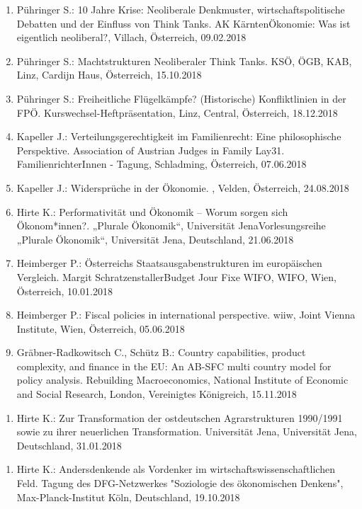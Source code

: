 \begin{enumerate}
	\item Pühringer S.: 10 Jahre Krise: Neoliberale Denkmuster, wirtschaftspolitische Debatten und der Einfluss von Think Tanks. AK KärntenÖkonomie: Was ist eigentlich neoliberal?, Villach, Österreich, 09.02.2018
	\item Pühringer S.: Machtstrukturen Neoliberaler Think Tanks. KSÖ, ÖGB, KAB, Linz, Cardijn Haus, Österreich, 15.10.2018
	\item Pühringer S.: Freiheitliche Flügelkämpfe? (Historische) Konfliktlinien in der FPÖ. Kurswechsel-Heftpräsentation, Linz, Central, Österreich, 18.12.2018
	\item Kapeller J.: Verteilungsgerechtigkeit im Familienrecht: Eine philosophische Perspektive. Association of Austrian Judges in Family Lay31. FamilienrichterInnen - Tagung, Schladming, Österreich, 07.06.2018
	\item Kapeller J.: Widersprüche in der Ökonomie. , Velden, Österreich, 24.08.2018
	\item Hirte K.: Performativität und Ökonomik – Worum sorgen sich Ökonom*innen?. „Plurale Ökonomik“, Universität JenaVorlesungsreihe „Plurale Ökonomik“, Universität Jena, Deutschland, 21.06.2018
	\item Heimberger P.: Österreichs Staatsausgabenstrukturen im europäischen Vergleich. Margit SchratzenstallerBudget Jour Fixe WIFO, WIFO, Wien, Österreich, 10.01.2018
	\item Heimberger P.: Fiscal policies in international perspective. wiiw, Joint Vienna Institute, Wien, Österreich, 05.06.2018
	\item Gräbner-Radkowitsch C., Schütz B.: Country capabilities, product complexity, and finance in the EU:  An AB-SFC multi country model for policy analysis. Rebuilding Macroeconomics, National Institute of Economic and Social Research, London, Vereinigtes Königreich, 15.11.2018
\end{enumerate}

\begin{enumerate}
	\item Hirte K.: Zur Transformation der ostdeutschen Agrarstrukturen 1990/1991 sowie zu ihrer neuerlichen Transformation. Universität Jena, Universität Jena, Deutschland, 31.01.2018
\end{enumerate}

\begin{enumerate}
	\item Hirte K.: Andersdenkende als Vordenker im wirtschaftswissenschaftlichen Feld. Tagung des DFG-Netzwerkes "Soziologie des ökonomischen Denkens", Max-Planck-Institut Köln, Deutschland, 19.10.2018
\end{enumerate}
